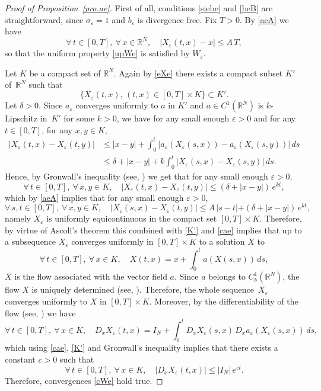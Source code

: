 \documentclass[JEP,XML,SOM,Unicode]{cedram}
\let \de \delta
\def \RR {\mathbb R}
\theoremstyle{plain}
\theoremstyle{definition}
\begin{document}
\begin{proof}[Proof of Proposition~\ref{pro.ae}]
First of all, conditions \eqref{siebe} and \eqref{beB} are straightforward, since $\sigma_\varepsilon=1$ and $b_\varepsilon$ is divergence free.
Fix $T>0$. By \eqref{aeA} we have
\begin{equation}\label{eXe}
\forall\,t\in[0,T],\ \forall\,x\in\RR^N,\quad |X_\varepsilon(t,x)-x|\leq A\,T,
\end{equation}
so that the uniform property \eqref{upWe} is satisfied by $W_\varepsilon$.

Let $K$ be a compact set of $\RR^N$. Again by \eqref{eXe} there exists a compact subset $K'$ of~$\RR^N$ such that
\begin{equation}\label{K'}
\big\{X_\varepsilon(t,x),\,(t,x)\in[0,T]\times K\big\}\subset K'.
\end{equation}
Let $\de>0$. Since $a_\varepsilon$ converges uniformly to $a$ in $K'$ and $a\in C^1(\RR^N)$ is $k$-Lipschitz in~$K'$ for some $k>0$, we have for any small enough $\varepsilon>0$ and for any $t\in[0,T]$, for any $x,y\in K$,
\begin{align*}
\big|X_\varepsilon(t,x)-X_\varepsilon(t,y)\big| & \leq |x-y|+\int_0^t \big|a_\varepsilon(X_\varepsilon(s,x))-a_\varepsilon(X_\varepsilon(s,y))\big|\,ds
\\
& \leq \de+|x-y|+k\int_0^t\big|X_\varepsilon(s,x)-X_\varepsilon(s,y)\big|\,ds.
\end{align*}
Hence, by Gronwall's inequality (see, \eg \cite[\S 17.3]{HSD}) we get that for any small enough $\varepsilon>0$,
\[
\forall\,t\in[0,T],\ \forall\,x,y\in K,\quad |X_\varepsilon(t,x)-X_\varepsilon(t,y)\big|\leq(\de+|x-y|)\,e^{kt},
\]
which by \eqref{aeA} implies that for any small enough $\varepsilon>0$,
\[
\forall\,s,t\in[0,T],\ \forall\,x,y\in K,\quad |X_\varepsilon(s,x)-X_\varepsilon(t,y)\big|\leq A\,|s-t|+(\de+|x-y|)\,e^{kt},
\]
namely $X_\varepsilon$ is uniformly equicontinuous in the compact set $[0,T]\times K$. Therefore, by virtue of Ascoli's theorem this combined with \eqref{K'} and \eqref{cae} implies that up to a subsequence $X_\varepsilon$ converges uniformly in $[0,T]\times K$ to a solution $X$ to
\[
\forall\,t\in[0,T],\ \forall\,x\in K,\quad X(t,x)=x+\int_0^t a(X(s,x))\,ds,
\]
\ie $X$ is the flow associated with the vector field $a$. Since $a$ belongs to $C^1_b(\RR^N)$, the flow $X$ is uniquely determined (see, \eg \cite[\S 17.4]{HSD}).
Therefore, the whole sequence~$X_\varepsilon$ converges uniformly to $X$ in $[0,T]\times K$.
Moreover, by the differentiability of the flow (see, \eg \cite[\S 17.6]{HSD}) we have
\begin{equation}\label{DX}
\forall\,t\in[0,T],\ \forall\,x\in K,\quad D_xX_\varepsilon(t,x)=I_N+\int_0^t D_x X_\varepsilon(s,x)\,D_x a_\varepsilon(X_\varepsilon(s,x))\,ds,
\end{equation}
which using \eqref{cae}, \eqref{K'} and Gronwall's inequality implies that there exists a constant $c>0$ such that
\[
\forall\,t\in[0,T],\ \forall\,x\in K,\quad |D_x X_\varepsilon(t,x)|\leq |I_N|\,e^{ct}.
\]
Therefore, convergences \eqref{cWe} hold true.


\end{proof}
\end{document}
